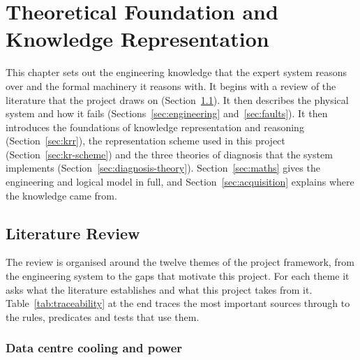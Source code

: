 \chapter{Theoretical Foundation and Knowledge Representation}
\label{ch:theory_and_kr}

This chapter sets out the engineering knowledge that the expert system reasons over and the formal machinery it reasons with. It begins with a review of the literature that the project draws on (Section~\ref{sec:litreview}). It then describes the physical system and how it fails (Sections~\ref{sec:engineering} and~\ref{sec:faults}). It then introduces the foundations of knowledge representation and reasoning (Section~\ref{sec:krr}), the representation scheme used in this project (Section~\ref{sec:kr-scheme}) and the three theories of diagnosis that the system implements (Section~\ref{sec:diagnosis-theory}). Section~\ref{sec:maths} gives the engineering and logical model in full, and Section~\ref{sec:acquisition} explains where the knowledge came from.

\section{Literature Review}
\label{sec:litreview}

The review is organised around the twelve themes of the project framework, from the engineering system to the gaps that motivate this project. For each theme it asks what the literature establishes and what this project takes from it. Table~\ref{tab:traceability} at the end traces the most important sources through to the rules, predicates and tests that use them.

\subsection{Data centre cooling and power}

